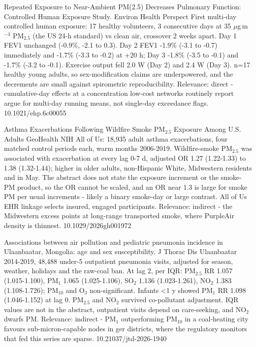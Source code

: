 \documentclass[10pt]{article}
\begin{document}
\par{}\baselineskip{}\baselineskip
{}

{Repeated Exposure to Near-Ambient PM(2.5) Decreases Pulmonary Function: Controlled Human Exposure Study.}
{Environ Health Perspect}
{First multi-day controlled human exposure: 17 healthy volunteers, 3 consecutive days at 35 $\mu$g\,m$^{-3}$ PM$_{2.5}$ (the US 24-h standard) vs clean air, crossover 2 weeks apart. Day 1 FEV1 unchanged (-0.9\%, -2.1 to 0.3). Day 2 FEV1 -1.9\% (-3.1 to -0.7) immediately and -1.7\% (-3.3 to -0.2) at +20 h; Day 3 -1.8\% (-3.5 to -0.1) and -1.7\% (-3.2 to -0.1). Exercise output fell 2.0 W (Day 2) and 2.4 W (Day 3). n=17 healthy young adults, so sex-modification claims are underpowered, and the decrements are small against spirometric reproducibility. Relevance: direct - cumulative-day effects at a concentration low-cost networks routinely report argue for multi-day running means, not single-day exceedance flags.}
{10.1021/ehp.6c00055}

{Asthma Exacerbations Following Wildfire Smoke PM$_{2.5}$ Exposure Among U.S. Adults}
{GeoHealth}
{NIH All of Us: 18,935 adult asthma exacerbations, four matched control periods each, warm months 2006-2019. Wildfire-smoke PM$_{2.5}$ was associated with exacerbation at every lag 0-7 d, adjusted OR 1.27 (1.22-1.33) to 1.38 (1.32-1.44); higher in older adults, non-Hispanic White, Midwestern residents and in May. The abstract does not state the exposure increment or the smoke-PM product, so the OR cannot be scaled, and an OR near 1.3 is large for smoke PM per usual increments - likely a binary smoke-day or large contrast. All of Us EHR linkage selects insured, engaged participants. Relevance: indirect - the Midwestern excess points at long-range transported smoke, where PurpleAir density is thinnest.}
{10.1029/2026gh001972}

{Associations between air pollution and pediatric pneumonia incidence in Ulaanbaatar, Mongolia: age and sex susceptibility.}
{J Thorac Dis}
{Ulaanbaatar 2014-2019, 48,488 under-5 outpatient pneumonia visits, adjusted for season, weather, holidays and the raw-coal ban. At lag 2, per IQR: PM$_{2.5}$ RR 1.057 (1.015-1.100), PM$_{1}$ 1.065 (1.025-1.106), SO$_2$ 1.136 (1.023-1.261), NO$_2$ 1.383 (1.108-1.726); PM$_{10}$ and O$_3$ non-significant. Infants <1 y showed PM$_{1}$ RR 1.098 (1.046-1.152) at lag 0. PM$_{2.5}$ and NO$_2$ survived co-pollutant adjustment. IQR values are not in the abstract, outpatient visits depend on care-seeking, and NO$_2$ dwarfs PM. Relevance: indirect - PM$_{1}$ outperforming PM$_{10}$ in a coal-heating city favours sub-micron-capable nodes in ger districts, where the regulatory monitors that fed this series are sparse.}
{10.21037/jtd-2026-1940}
\end{document}
